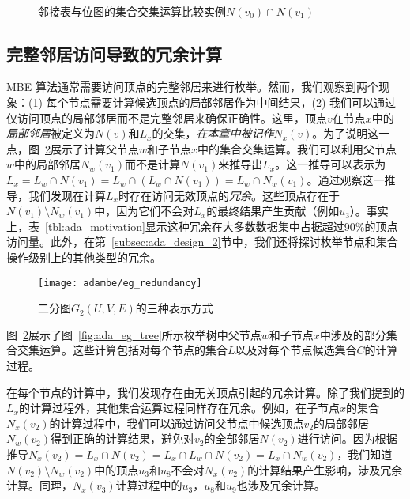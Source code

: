 

\begin{figure} [t]
	\centering

  \\

	\caption{邻接表与位图的集合交集运算比较实例$N(v_0)\cap N(v_1)$}
	\label{fig:adambe_intersection}
\end{figure}

\subsection{完整邻居访问导致的冗余计算}
\label{subsec:ada_limitation}

MBE 算法通常需要访问顶点的完整邻居来进行枚举。然而，我们观察到两个现象：(1) 每个节点需要计算候选顶点的局部邻居作为中间结果，(2) 我们可以通过仅访问顶点的局部邻居而不是完整邻居来确保正确性。这里，顶点$v$在节点$x$中的\emph{局部邻居}被定义为$N(v)$和$L_x$的交集，\emph{在本章中被记作$N_x(v)$}。为了说明这一点，图~\ref{fig:ada_motivation_2}展示了计算父节点$w$和子节点$x$中的集合交集运算。我们可以利用父节点$w$中的局部邻居$N_w(v_1)$而不是计算$N(v_1)$来推导出$L_x$。这一推导可以表示为$L_x = L_w \cap N(v_1) = L_w \cap (L_w \cap N(v_1)) = L_w \cap N_w(v_1)$。通过观察这一推导，我们发现在计算$L_x$时存在访问无效顶点的\emph{冗余}。这些顶点存在于$N(v_1) \setminus N_w(v_1)$中，因为它们不会对$L_x$的最终结果产生贡献（例如$u_3$）。事实上，表~\ref{tbl:ada_motivation}显示这种冗余在大多数数据集中占据超过90\%的顶点访问量。此外，在第~\ref{subsec:ada_design_2}节中，我们还将探讨枚举节点和集合操作级别上的其他类型的冗余。

\begin{figure} [H]
	\centering
  \vspace{0.05in}
	\texttt{[image: adambe/eg\_redundancy]}
  \vspace{0.05in}
	\caption{二分图$G_2(U,V,E)$的三种表示方式}

	\label{fig:ada_motivation_2}
\end{figure}

\begin{example}
  图~\ref{fig:ada_motivation_2}展示了图~\ref{fig:ada_eg_tree}所示枚举树中父节点$w$和子节点$x$中涉及的部分集合交集运算。这些计算包括对每个节点的集合$L$以及对每个节点候选集合$C$的计算过程。

  在每个节点的计算中，我们发现存在由无关顶点引起的冗余计算。除了我们提到的$L_x$的计算过程外，其他集合运算过程同样存在冗余。例如，在子节点$x$的集合$N_x(v_2)$的计算过程中，我们可以通过访问父节点中候选顶点$v_2$的局部邻居$N_w(v_2)$得到正确的计算结果，避免对$v_2$的全部邻居$N(v_2)$进行访问。因为根据推导$N_x(v_2) = L_x\cap N(v_2) = L_x \cap L_w \cap N(v_2) = L_x \cap N_w(v_2)$，我们知道$N(v_2)\setminus N_w(v_2)$中的顶点$u_3$和$u_8$不会对$N_x(v_2)$的计算结果产生影响，涉及冗余计算。同理，$N_x(v_3)$计算过程中的$u_3$，$u_8$和$u_9$也涉及冗余计算。
  
\end{example}

